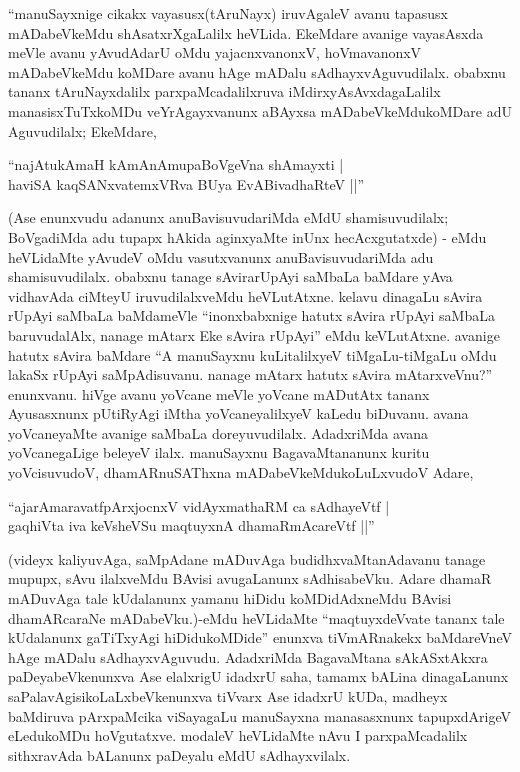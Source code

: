 ``manuSayxnige cikakx vayasusx(tAruNayx) iruvAgaleV avanu tapasusx mADabeVkeMdu shAsatxrXgaLalilx heVLida. EkeMdare avanige vayasAsxda meVle avanu yAvudAdarU oMdu yajacnxvanonxV, hoVmavanonxV mADabeVkeMdu koMDare avanu hAge mADalu sAdhayxvAguvudilalx. obabxnu tananx tAruNayxdalilx parxpaMcadalilxruva iMdirxyAsAvxdagaLalilx manasisxTuTxkoMDu veYrAgayxvanunx aBAyxsa mADabeVkeMdukoMDare adU Aguvudilalx; EkeMdare,

\begin{shloka}
``najAtukAmaH kAmAnAmupaBoVgeVna shAmayxti |\\
haviSA kaqSANxvatemxVRva BUya EvABivadhaRteV ||''
\end{shloka}

(Ase enunxvudu adanunx anuBavisuvudariMda eMdU shamisuvudilalx; BoVgadiMda adu tupapx hAkida aginxyaMte inUnx hecAcxgutatxde) - eMdu heVLidaMte yAvudeV oMdu vasutxvanunx anuBavisuvudariMda adu shamisuvudilalx. obabxnu tanage sAvirarUpAyi saMbaLa baMdare yAva vidhavAda ciMteyU iruvudilalxveMdu heVLutAtxne. kelavu dinagaLu sAvira rUpAyi saMbaLa baMdameVle ``inonxbabxnige hatutx sAvira rUpAyi saMbaLa baruvudalAlx, nanage mAtarx Eke sAvira rUpAyi'' eMdu keVLutAtxne. avanige hatutx sAvira baMdare ``A manuSayxnu kuLitalilxyeV tiMgaLu-tiMgaLu oMdu lakaSx rUpAyi saMpAdisuvanu. nanage mAtarx hatutx sAvira mAtarxveVnu?'' enunxvanu. hiVge avanu yoVcane meVle yoVcane mADutAtx tananx Ayusasxnunx pUtiRyAgi iMtha yoVcaneyalilxyeV kaLedu biDuvanu. avana yoVcaneyaMte avanige saMbaLa doreyuvudilalx. AdadxriMda avana yoVcanegaLige beleyeV ilalx. manuSayxnu BagavaMtananunx kuritu yoVcisuvudoV, dhamARnuSAThxna mADabeVkeMdukoLuLxvudoV Adare,

\begin{shloka}
``ajarAmaravatfpArxjocnxV vidAyxmathaRM ca sAdhayeVtf |\\
gaqhiVta iva keVsheVSu maqtuyxnA dhamaRmAcareVtf ||''
\end{shloka}

(videyx kaliyuvAga, saMpAdane mADuvAga budidhxvaMtanAdavanu tanage mupupx, sAvu ilalxveMdu BAvisi avugaLanunx sAdhisabeVku. Adare dhamaR mADuvAga tale kUdalanunx yamanu hiDidu koMDidAdxneMdu BAvisi dhamARcaraNe mADabeVku.)-eMdu heVLidaMte ``maqtuyxdeVvate tananx tale kUdalanunx gaTiTxyAgi hiDidukoMDide'' enunxva tiVmARnakekx baMdareVneV hAge mADalu sAdhayxvAguvudu. AdadxriMda BagavaMtana sAkASxtAkxra paDeyabeVkenunxva Ase elalxrigU idadxrU saha, tamamx bALina dinagaLanunx saPalavAgisikoLaLxbeVkenunxva tiVvarx Ase idadxrU kUDa, madheyx baMdiruva pArxpaMcika viSayagaLu manuSayxna manasasxnunx tapupxdArigeV eLedukoMDu hoVgutatxve. modaleV heVLidaMte nAvu I parxpaMcadalilx sithxravAda bALanunx paDeyalu eMdU sAdhayxvilalx.

